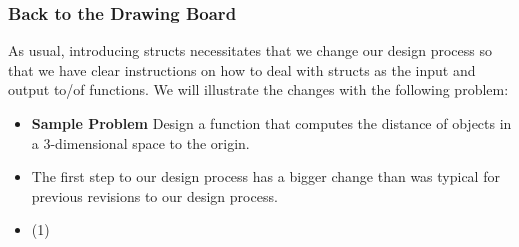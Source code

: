 \documentclass{beamer}
\begin{document}
\begin{frame}
  \frametitle{Back to the Drawing Board}
  As usual, introducing structs necessitates that we change our design process so that we have clear
  instructions on how to deal with structs as the input and output to/of functions. We will
  illustrate the changes with the following problem:
  \begin{itemize}
  \item<2-> \textbf{Sample Problem} Design a function that computes the distance of objects in a 3-dimensional space to the origin.
  \item<3-> The first step to our design process has a bigger change than was typical for previous revisions to our design process.
  \item<4-> (1)
  \end{itemize}
\end{frame}
\end{document}
